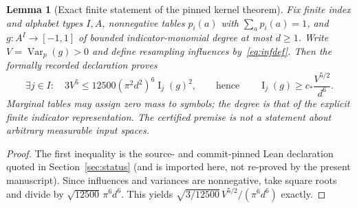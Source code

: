 \documentclass[11pt,letterpaper]{article}
\newtheorem{lemma}[theorem]{Lemma}
\theoremstyle{definition}\newtheorem{definition}[theorem]{Definition}
\newcommand{\Var}{\operatorname{Var}}
\newcommand{\Inf}{\operatorname{I}}
\begin{document}
\begin{lemma}[Exact finite statement of the pinned kernel theorem]\label{lem:finitelean}
Fix finite index and alphabet types $I,A$, nonnegative tables $p_i(a)$ with $\sum_a p_i(a)=1$, and $g:A^I\to[-1,1]$ of bounded indicator-monomial degree at most $d\ge1$. Write $V=\Var_p(g)>0$ and define resampling influences by~\eqref{eq:infdef}. Then the formally recorded declaration proves
\begin{equation}\label{eq:finitelean}
 \exists j\in I:\quad
 3V^5\le12500(\pi^2d^2)^6\Inf_j(g)^2,
 \qquad\text{hence}\qquad
 \Inf_j(g)\ge c_*\frac{V^{5/2}}{d^6}.
\end{equation}
Marginal tables may assign zero mass to symbols; the degree is that of the explicit finite indicator representation. The certified premise is \emph{not} a statement about arbitrary measurable input spaces.
\end{lemma}
\begin{proof}
The first inequality is the source- and commit-pinned Lean declaration quoted in Section~\ref{sec:status} (and is imported here, not re-proved by the present manuscript). Since influences and variances are nonnegative, take square roots and divide by $\sqrt{12500}\,\pi^6d^6$. This yields $\sqrt{3/12500}\,V^{5/2}/(\pi^6d^6)$ exactly.
\end{proof}
\end{document}
